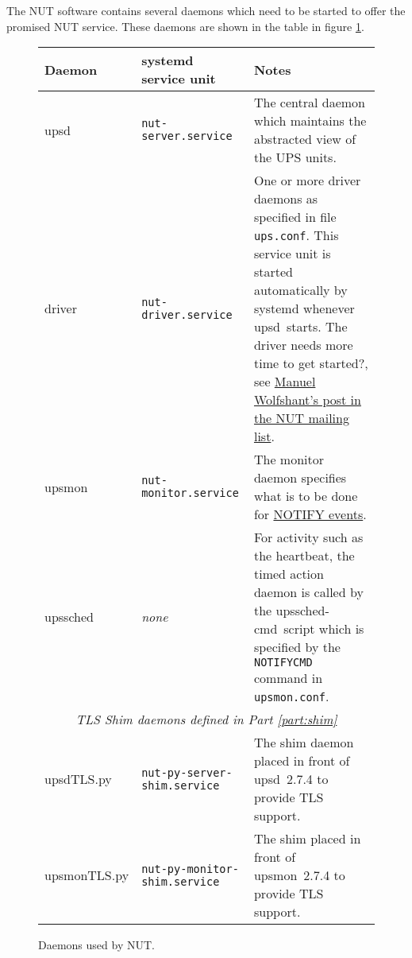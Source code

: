 \documentclass[12pt]{article}
\newcommand{\upsd}{\mbox{\textcolor{UPSDCOLOUR}{upsd}}}
\newcommand{\driver}{\mbox{\textcolor{UPSDCOLOUR}{driver}}}
\newcommand{\upsmon}{\mbox{\textcolor{MONCOLOUR}{upsmon}}}
\newcommand{\upssched}{\mbox{\textcolor{SCHEDCOLOUR}{upssched}}}
\newcommand{\upsschedcmd}{\mbox{\textcolor{CMDCOLOUR}{upssched-cmd}}}
\newcommand{\upsdTLS}{\mbox{\textcolor{UPSDCOLOUR}{upsdTLS.py}}}
\newcommand{\upsmonTLS}{\mbox{\textcolor{UPSMONCOLOUR}{upsmonTLS.py}}}
\newcommand{\UPSmon}{\mbox{\textcolor{UPSMONCOLOUR}{UPSmon.py}}}
\newcommand{\upsconf}{\textcolor{UPSDCOLOUR}{\texttt{ups.conf}}}
\newcommand{\upsmonconf}{\textcolor{MONCOLOUR}{\texttt{upsmon.conf}}}
\begin{document}
The NUT software contains several daemons which need to be started to
offer the promised NUT service.  These daemons are shown in the table
in figure \ref{fig:daemons}.

\begin{figure}[ht]
\begin{center}
\begin{tabular}{|l|l|p{0.52\LinePrinterwidth}|}
\hline \textbf{Daemon} & \textbf{systemd service unit} &
\textbf{Notes} \\ \hline\hline
\upsd       & \texttt{nut-server.service}
            & The central daemon which maintains the abstracted view 
              of the UPS units. \\ \hline
\driver     & \texttt{nut-driver.service}
            & One or more driver daemons as specified in file \upsconf.  This
              service unit is started automatically by systemd whenever
              \upsd\ starts. The driver needs more time to get started?, see
              \href{https://alioth-lists.debian.net/pipermail/nut-upsuser/2022-January/012653.html}%
                   {Manuel Wolfshant's post in the NUT mailing list}. \\ \hline
\upsmon     & \texttt{nut-monitor.service}
            & The monitor daemon specifies what is to be done for 
              \hyperref[fig:NOTIFYevents]{NOTIFY events}. \\ \hline
\upssched   & \textit{none}
            & For activity such as the heartbeat, the timed action daemon 
              is called by the \upsschedcmd\ script which is specified 
              by the \texttt{NOTIFYCMD} command in \upsmonconf.  \\ \hline\hline
\multicolumn{3}{|c|}{\textit{TLS Shim daemons defined in Part \ref{part:shim}}} \\ \hline
\upsdTLS    & \texttt{nut-py-server-shim.service}
            & The shim daemon placed in front of \upsd\ 2.7.4 to provide TLS support. \\ \hline
\upsmonTLS  & \texttt{nut-py-monitor-shim.service}
            & The shim placed in front of \upsmon\ 2.7.4 to provide TLS support. \\ \hline\hline
\end{tabular}
\caption{Daemons used by NUT.\label{fig:daemons}}
\end{center}
\end{figure}
  
\end{document}
